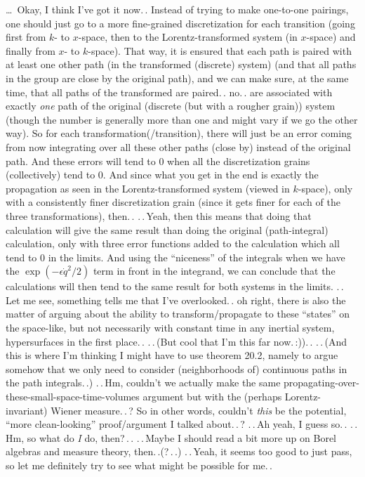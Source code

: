 \documentclass{report}
\begin{document}
\ldots\ Okay, I think I've got it now.\,. Instead of trying to make one-to-one pairings, one should just go to a more fine-grained discretization for each transition (going first from $k$- to $x$-space, then to the Lorentz-transformed system (in $x$-space) and finally from $x$- to $k$-space). That way, it is ensured that each path is paired with at least one other path (in the transformed (discrete) system) (and that all paths in the group are close by the original path), and we can make sure, at the same time, that all paths of the transformed are paired.\,. no.\,. are associated with exactly \emph{one} path of the original (discrete (but with a rougher grain)) system (though the number is generally more than one and might vary if we go the other way). So for each transformation(/transition), there will just be an error coming from now integrating over all these other paths (close by) instead of the original path. And these errors will tend to 0 when all the discretization grains (collectively) tend to 0. And since what you get in the end is exactly the propagation as seen in the Lorentz-transformed system (viewed in $k$-space), only with a consistently finer discretization grain (since it gets finer for each of the three transformations), then.\,. .\,.\,Yeah, then this means that doing that calculation will give the same result than doing the original (path-integral) calculation, only with three error functions added to the calculation which all tend to 0 in the limits. And using the ``niceness'' of the integrals when we have the $\exp(-\epsilon \dot q^2/2)$ term in front in the integrand, we can conclude that the calculations will then tend to the same result for both systems in the limits. .\,.\,Let me see, something tells me that I've overlooked.\,. oh right, there is also the matter of arguing about the ability to transform/propagate to these ``states'' on the space-like, but not necessarily with constant time in any inertial system, hypersurfaces in the first place.\,. .\,.\,(But cool that I'm this far now.\,:)).\,. .\,.\,(And this is where I'm thinking I might have to use theorem 20.2, namely to argue somehow that we only need to consider (neighborhoods of) continuous paths in the path integrals.\,.) %
.\,.\,Hm, couldn't we actually make the same propagating-over-these-small-space-time-volumes argument but with the (perhaps Lorentz-invariant) Wiener measure.\,.\,? So in other words, couldn't \emph{this} be the potential, ``more clean-looking'' proof/argument I talked about.\,.\,? %
.\,.\,Ah yeah, I guess so.\,. .\,.\,Hm, so what do \emph{I} do, then?\,.\,. .\,.\,Maybe I should read a bit more up on Borel algebras and measure theory, then.\,.(?\,.\,.) .\,.\,Yeah, it seems too good to just pass, so let me definitely try to see what might be possible for me.\,. %
\end{document}
